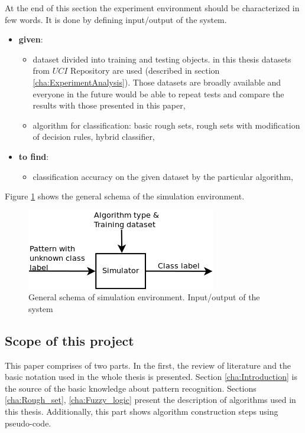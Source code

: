 At the end of this section the experiment environment should be characterized in
few words. It is done by defining input/output of the system.
\begin{itemize}
    \item \textbf{given}:
        \begin{itemize}
            \item dataset divided into training and testing objects. in
                this thesis datasets from $UCI$ Repository are used (described in section
                \ref{cha:ExperimentAnalysis}). Those datasets are broadly available and everyone in the
                future would be able to repeat tests and compare the
                results with those presented in this paper,
            \item algorithm for classification: basic rough sets, rough sets
                with modification of decision rules, hybrid classifier,
        \end{itemize}
    \item \textbf{to find}: 
        \begin{itemize}
            \item classification accuracy on the given dataset by the
                particular algorithm,
        \end{itemize}
\end{itemize}
Figure \ref{fig:input_output} shows the general schema of the simulation environment.
\begin{figure}[H]
    \begin{center}
        \includegraphics{fig/schema.png}
    \end{center}
    \caption{General schema of simulation environment. Input/output of the
    system}
    \label{fig:input_output}
\end{figure}

\subsection{Scope of this project} 
This paper comprises of two parts. In the first, the review of
literature and the basic notation used in the whole thesis is presented. Section
\ref{cha:Introduction} is the source of the basic
knowledge about pattern recognition. Sections \ref{cha:Rough_set}, \ref{cha:Fuzzy_logic}
present the description of algorithms used in this thesis. Additionally, this
part shows algorithm construction steps using pseudo-code.

